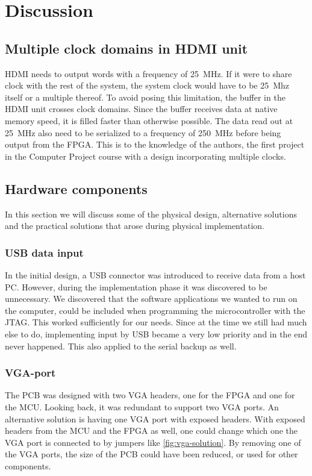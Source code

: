 \documentclass[../main/report.tex]{subfiles}
\begin{document}
\chapter{Discussion}

\section{Multiple clock domains in HDMI unit}
HDMI needs to output words with a frequency of \SI{25}{MHz}.
If it were to share clock with the rest of the system, the system clock would have to be \SI{25}{Mhz} itself or a multiple thereof.
To avoid posing this limitation, the buffer in the HDMI unit crosses clock domains.
Since the buffer receives data at native memory speed, it is filled faster than otherwise possible.
The data read out at \SI{25}{MHz} also need to be serialized to a frequency of \SI{250}{MHz} before being output from the FPGA.
This is to the knowledge of the authors, the first project in the Computer Project course with a design incorporating multiple clocks.

\section{Hardware components}
In this section we will discuss some of the physical design, alternative solutions and the practical solutions that arose during physical implementation.

\subsection*{USB data input}
In the initial design, a USB connector was introduced to receive data from a host PC. 
However, during the implementation phase it was discovered to be unnecessary.
We discovered that the software applications we wanted to run on the computer, could be included when programming the microcontroller with the JTAG.
This worked sufficiently for our needs. 
Since at the time we still had much else to do, implementing input by USB became a very low priority and in the end never happened.
This also applied to the serial backup as well.

\subsection*{VGA-port}
The PCB was designed with two VGA headers, one for the FPGA and one for the MCU. 
Looking back, it was redundant to support two VGA ports.
An alternative solution is having one VGA port with exposed headers.
With exposed headers from the MCU and the FPGA as well, one could change which one the VGA port is connected to by jumpers like \ref{fig:vga-solution}.
By removing one of the VGA ports, the size of the PCB could have been reduced, or used for other components. 
\end{document}
